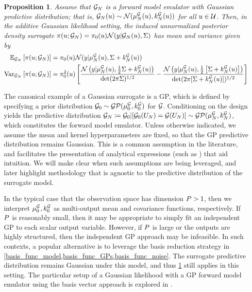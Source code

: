 \documentclass[12pt]{article}
\newtheorem{prop}{Proposition}
\begin{document}
\begin{prop} \label{prop:fwd-em-Gaussian}
Assume that $\fwdEm[\Ndesign]$ is a forward model emulator with Gaussian predictive distribution; 
that is, $\fwdEm[\Ndesign](\Par) \sim \Gaussian(\emMean[\Ndesign]{\fwd}(\Par), \emKer[\Ndesign]{\fwd}(\Par))$
for all $\Par \in \parSpace$. Then, in the additive Gaussian likelihood setting, the induced unnormalized 
posterior density surrogate 
$\postDens(\Par; \fwdEm[\Ndesign]) = \priorDens(\Par)\Gaussian(\obs| \fwdEm[\Ndesign](\Par), \likPar)$
has mean and variance given by
\begin{align*}
\E_{\fwdEm}\left[\postDens(\Par; \fwdEm[\Ndesign]) \right] 
&= \priorDens(\Par) \Gaussian(\obs | \emMean[\Ndesign]{\fwd}(\Par), \likPar + \emKer[\Ndesign]{\fwd}(\Par)) \\
\Var_{\fwdEm}\left[\postDens(\Par; \fwdEm[\Ndesign]) \right]
&= \priorDens^2(\Par) \left[\frac{\Gaussian\left(\obs | \emMean[\Ndesign]{\fwd}(\Par), \frac{1}{2}\likPar + \emKer[\Ndesign]{\fwd}(\Par)  \right)}{\det(2\pi \likPar)^{1/2}}
- \frac{\Gaussian\left(\obs | \emMean[\Ndesign]{\fwd}(\Par), \frac{1}{2}\left[\likPar + \emKer[\Ndesign]{\fwd}(\Par)\right]  \right)}{\det(2\pi [\likPar + \emKer[\Ndesign]{\fwd}(\Par)])^{1/2}}\right]
\end{align*}
\end{prop}

The canonical example of a Gaussian surrogate is a GP, which is defined by specifying a prior distribution  
$\fwdPrior \sim \GP(\emMeanPrior{\fwd}, \emKerPrior{\fwd})$ for $\fwd$. Conditioning on the design yields 
the predictive distribution 
$\fwdEm[\Ndesign]  \Def \fwdPrior|[\fwdPrior(\designIn) = \fwd(\designIn)] \sim \GP(\emMean[\Ndesign]{\fwd}, \emKer[\Ndesign]{\fwd})$, 
which constitutes the forward model emulator.
Unless otherwise indicated, we assume the mean and kernel hyperparameters are
fixed, so that the GP predictive distribution remains Gaussian. This is a common assumption in the literature, 
and facilitates the presentation of analytical expressions (such as )
that aid intuition. We will make clear when such assumptions are being 
leveraged, and later highlight methodology that is agnostic to the predictive distribution of the surrogate model.

In the typical case that the observation space has dimension $\dimObs > 1$, then we interpret 
$\emMeanPrior{\fwd}, \emKerPrior{\fwd}$ as multi-output mean and covariance functions, respectively.
If $\dimObs$ is reasonably small, then it may be appropriate to simply fit an independent GP to 
each scalar output variable. However, if $\dimObs$ is large or the outputs are highly structured, 
then the independent GP approach may be infeasible.  
In such contexts, a popular 
alternative is to leverage the basis reduction strategy in \cref{basis_func_model,basis_func_GPs,basis_func_noise}.
The surrogate predictive distribution remains Gaussian under this model, and thus \cref{prop:fwd-em-Gaussian} still applies in this setting. The particular setup of a Gaussian likelihood with a GP forward model emulator using the basis vector approach is explored in \citet{Surer2023sequential}. 
\end{document}
